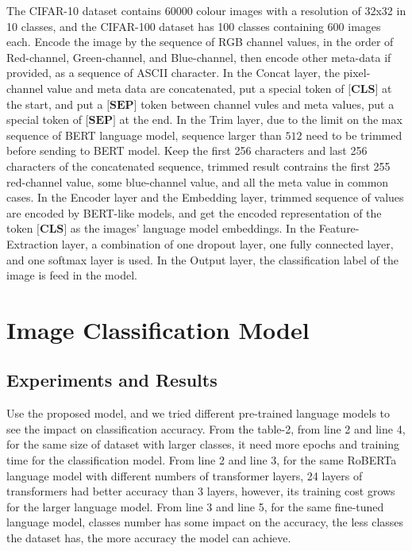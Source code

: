 \documentclass[review]{cvpr}
\begin{document}
\par The CIFAR-10 dataset contains 60000 colour images with a resolution of 32x32 in 10 classes, and the CIFAR-100 dataset has 100 classes containing 600 images each.
Encode the image by the sequence of RGB channel values, in the order of Red-channel, Green-channel, and Blue-channel,
then encode other meta-data if provided, as a sequence of ASCII character.
In the Concat layer, the pixel-channel value and meta data are concatenated, put a special token of $\textbf{[CLS]}$ at the start,
and put a $\textbf{[SEP]}$ token between channel vules and meta values, put a special token of $\textbf{[SEP]}$ at the end.
In the Trim layer, due to the limit on the max sequence of BERT language model, sequence larger than $512$ need to be trimmed before sending to BERT model.
Keep the first 256 characters and last 256 characters of the concatenated sequence, trimmed result contrains the first 255 red-channel value,
some blue-channel value, and all the meta value in common cases.
In the Encoder layer and the Embedding layer, trimmed sequence of values are encoded by BERT-like models,
and get the encoded representation of the token $\textbf{[CLS]}$ as the images' language model embeddings.
In the Feature-Extraction layer, a combination of one dropout layer, one fully connected layer, and one softmax layer is used.
In the Output layer, the classification label of the image is feed in the model.



\section{Image Classification Model}

\subsection{Experiments and Results}

Use the proposed model, and we tried different pre-trained language models to see the impact on classification accuracy.
From the table-2, from line 2 and line 4, for the same size of dataset with larger classes, it need more epochs and training time for the classification model.
From line 2 and line 3, for the same RoBERTa language model with different numbers of transformer layers, 24 layers of transformers had better accuracy than 3 layers,
however, its training cost grows for the larger language model.
From line 3 and line 5, for the same fine-tuned language model, classes number has some impact on the accuracy,
the less classes the dataset has, the more accuracy the model can achieve.
\end{document}

